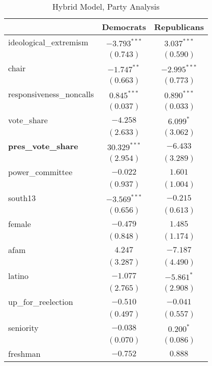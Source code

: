 \documentclass[12pt]{article}
\begin{document}
\begin{table}
	\begin{center}
		\caption{Hybrid Model, Party Analysis}
		\begin{tabular}{l c c }
			\hline
			& Democrats & Republicans \\
			\hline
			ideological\_extremism   & $-3.793^{***}$ & $3.037^{***}$  \\
			& $(0.743)$      & $(0.590)$      \\
			chair                    & $-1.747^{**}$  & $-2.995^{***}$ \\
			& $(0.663)$      & $(0.773)$      \\
			responsiveness\_noncalls & $0.845^{***}$  & $0.890^{***}$  \\
			& $(0.037)$      & $(0.033)$      \\
			vote\_share              & $-4.258$       & $6.099^{*}$    \\
			& $(2.633)$      & $(3.062)$      \\
			\textbf{pres\_vote\_share}        & $30.329^{***}$ & $-6.433$       \\
			& $(2.954)$      & $(3.289)$      \\
			power\_committee         & $-0.022$       & $1.601$        \\
			& $(0.937)$      & $(1.004)$      \\
			south13                  & $-3.569^{***}$ & $-0.215$       \\
			& $(0.656)$      & $(0.613)$      \\
			female                   & $-0.479$       & $1.485$        \\
			& $(0.848)$      & $(1.174)$      \\
			afam                     & $4.247$        & $-7.187$       \\
			& $(3.287)$      & $(4.490)$      \\
			latino                   & $-1.077$       & $-5.861^{*}$   \\
			& $(2.765)$      & $(2.908)$      \\
			up\_for\_reelection      & $-0.510$       & $-0.041$       \\
			& $(0.497)$      & $(0.557)$      \\
			seniority                & $-0.038$       & $0.200^{*}$    \\
			& $(0.070)$      & $(0.086)$      \\
			freshman                 & $-0.752$       & $0.888$        \\

\end{tabular}
\end{center}
\end{table}
\end{document}
